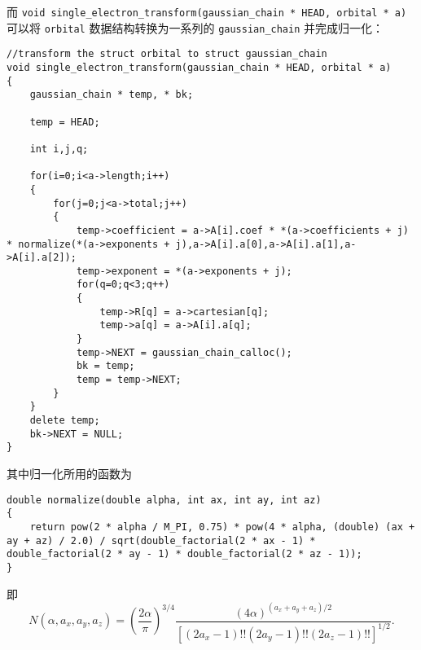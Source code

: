 \documentclass[12pt,a4paper,openany,twoside]{article}
\numberwithin{equation}{section}
\begin{document}
                而 \lstinline$void single_electron_transform(gaussian_chain * HEAD, orbital * a)$ 可以将 \lstinline$orbital$ 数据结构转换为一系列的 \lstinline$gaussian_chain$ 并完成归一化：
                \begin{lstlisting}
//transform the struct orbital to struct gaussian_chain
void single_electron_transform(gaussian_chain * HEAD, orbital * a)
{
    gaussian_chain * temp, * bk;

    temp = HEAD;

    int i,j,q;

    for(i=0;i<a->length;i++)
    {
        for(j=0;j<a->total;j++)
        {
            temp->coefficient = a->A[i].coef * *(a->coefficients + j) * normalize(*(a->exponents + j),a->A[i].a[0],a->A[i].a[1],a->A[i].a[2]);
            temp->exponent = *(a->exponents + j);
            for(q=0;q<3;q++)
            {
                temp->R[q] = a->cartesian[q];
                temp->a[q] = a->A[i].a[q];
            }
            temp->NEXT = gaussian_chain_calloc();
            bk = temp;
            temp = temp->NEXT;
        }
    }
    delete temp;
    bk->NEXT = NULL;
}
                \end{lstlisting}

                其中归一化所用的函数为
                \begin{lstlisting}
double normalize(double alpha, int ax, int ay, int az)
{
    return pow(2 * alpha / M_PI, 0.75) * pow(4 * alpha, (double) (ax + ay + az) / 2.0) / sqrt(double_factorial(2 * ax - 1) * double_factorial(2 * ay - 1) * double_factorial(2 * az - 1));
}
                \end{lstlisting}
                即\cite{obara1986efficient}
                \begin{equation}
                    N(\alpha,a_x,a_y,a_z) = \left(\frac{2 \alpha}{\pi}\right)^{3/4} \frac{(4\alpha)^{(a_x+a_y+a_z)/2}}{[(2a_x-1)!!(2a_y-1)!!(2a_z-1)!!]^{1/2}}.
                \end{equation}
                
\end{document}
